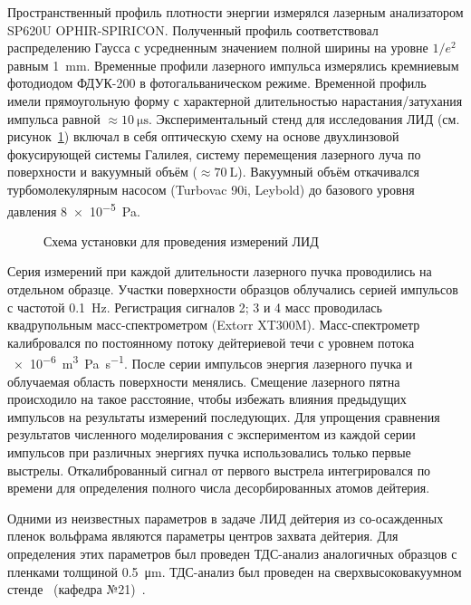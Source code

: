 Пространственный профиль плотности энергии измерялся лазерным анализатором SP620U OPHIR-SPIRICON. Полученный профиль соответствовал распределению Гаусса с усредненным значением полной ширины на уровне $1/e^2$ равным \SI{1}{\milli\metre}. Временные профили лазерного импульса измерялись кремниевым фотодиодом ФДУК-200 в фотогальваническом режиме. Временной профиль имели прямоугольную форму с характерной длительностью нарастания/затухания импульса равной \( \approx \SI{10}{\micro\second} \). Экспериментальный стенд для исследования ЛИД (см. рисунок~\ref{fig:ch4/LID_scheme}) включал в себя оптическую схему на основе двухлинзовой фокусирующей системы Галилея, систему перемещения лазерного луча по поверхности и вакуумный объём ($\approx\SI{70}{\liter}$). Вакуумный объём откачивался турбомолекулярным насосом (Turbovac 90i, Leybold) до базового уровня давления \SI{8e-5}{\pascal}. 

\begin{figure}[ht]
    \caption{Схема установки для проведения измерений ЛИД~\cite{Medvedev2024}}\label{fig:ch4/LID_scheme}
\end{figure}

Серия измерений при каждой длительности лазерного пучка проводились на отдельном образце. Участки поверхности образцов облучались серией импульсов с частотой \SI{0.1}{\hertz}. Регистрация сигналов 2; 3 и 4 масс проводилась квадрупольным масс-спектрометром (Extorr XT300M). Масс-спектрометр калибровался по постоянному потоку дейтериевой течи с уровнем потока \SI{e-6}{\metre\cubed\pascal\per\second}. После серии импульсов энергия лазерного пучка и облучаемая область поверхности менялись. Смещение лазерного пятна происходило на такое расстояние, чтобы избежать влияния предыдущих импульсов на результаты измерений последующих. Для упрощения сравнения результатов численного моделирования с экспериментом из каждой серии импульсов при различных энергиях пучка использовались только первые выстрелы. Откалиброванный сигнал от первого выстрела интегрировался по времени для определения полного числа десорбированных атомов дейтерия.

Одними из неизвестных параметров в задаче ЛИД дейтерия из со-осажденных пленок вольфрама являются параметры центров захвата дейтерия. Для определения этих параметров был проведен ТДС-анализ аналогичных образцов с пленками толщиной \SI{0.5}{\micro\metre}. ТДС-анализ был проведен на сверхвысоковакуумном стенде \thesisOrganizationShort \ (кафедра №21)~\cite{Rusinov2009}.

